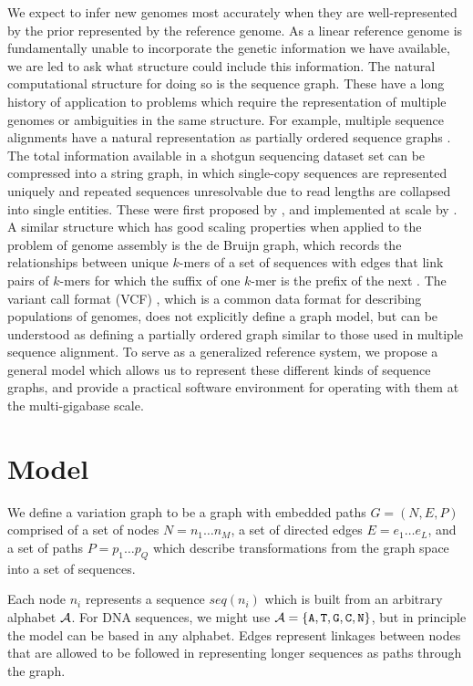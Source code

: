 \documentclass{article}
\begin{document}
We expect to infer new genomes most accurately when they are well-represented by the prior represented by the reference genome.
As a linear reference genome is fundamentally unable to incorporate the genetic information we have available, we are led to ask what structure could include this information.
The natural computational structure for doing so is the sequence graph.
These have a long history of application to problems which require the representation of multiple genomes or ambiguities in the same structure.
For example, multiple sequence alignments have a natural representation as partially ordered sequence graphs \cite{lee2002POA}.
The total information available in a shotgun sequencing dataset set can be compressed into a string graph, in which single-copy sequences are represented uniquely and repeated sequences unresolvable due to read lengths are collapsed into single entities.
These were first proposed by \cite{myers2005}, and implemented at scale by \cite{simpson2010}.
A similar structure which has good scaling properties when applied to the problem of genome assembly is the de Bruijn graph, which records the relationships between unique $k$-mers of a set of sequences with edges that link pairs of $k$-mers for which the suffix of one $k$-mer is the prefix of the next \cite{iqbal2012}.
The variant call format (VCF) \cite{danecek2011}, which is a common data format for describing populations of genomes, does not explicitly define a graph model, but can be understood as defining a partially ordered graph similar to those used in multiple sequence alignment. 
To serve as a generalized reference system, we propose a general model which allows us to represent these different kinds of sequence graphs, and provide a practical software environment for operating with them at the multi-gigabase scale.

\section{Model}

We define a variation graph to be a graph with embedded paths $G = ( N, E, P )$ comprised of
a set of nodes $N = n_1 \ldots n_M$,
a set of directed edges $E = e_1 \ldots e_L$,
and a set of paths $P = p_1 \ldots p_Q$ which describe transformations from the graph space into a set of sequences.

Each node $n_i$ represents a sequence $seq(n_i)$ which is built from an arbitrary alphabet ${ \cal A }$.
For DNA sequences, we might use ${ \cal A } = \{ {\tt A, T, G, C, N} \}$, but in principle the model can be based in any alphabet.
Edges represent linkages between nodes that are allowed to be followed in representing longer sequences as paths through the graph.
\end{document}
